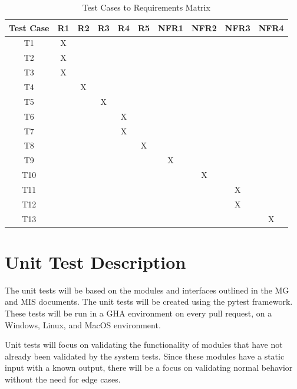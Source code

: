 \documentclass[12pt, titlepage]{article}
\begin{document}
\begin{table}[h]
\centering
\begin{tabular}{|c|c|c|c|c|c|c|c|c|c|}
\hline
\textbf{Test Case} & \textbf{R1} & \textbf{R2} & \textbf{R3} & \textbf{R4} & \textbf{R5} & \textbf{NFR1} & \textbf{NFR2} & \textbf{NFR3} & \textbf{NFR4} \\ \hline
T1 & X &   &   &   &   &   &   &   &   \\ \hline
T2 & X &   &   &   &   &   &   &   &   \\ \hline
T3 & X &   &   &   &   &   &   &   &   \\ \hline
T4 &   & X &   &   &   &   &   &   &   \\ \hline
T5 &   &   & X &   &   &   &   &   &   \\ \hline
T6 &   &   &   & X &   &   &   &   &   \\ \hline
T7 &   &   &   & X &   &   &   &   &   \\ \hline
T8 &   &   &   &   & X &   &   &   &   \\ \hline
T9 &   &   &   &   &   & X &   &   &   \\ \hline
T10 &  &   &   &   &   &   & X &   &   \\ \hline
T11 &  &   &   &   &   &   &   & X &   \\ \hline
T12 &  &   &   &   &   &   &   & X &   \\ \hline
T13 &  &   &   &   &   &   &   &   & X \\ \hline
\end{tabular}
\caption{Test Cases to Requirements Matrix}
\label{tab:test-requirements-matrix}
\end{table}

\section{Unit Test Description}

The unit tests will be based on the modules and interfaces outlined in the
MG \citep{MG} and MIS \citep{MIS} documents. The unit tests will be created using
the pytest framework. These tests will be run in a GHA environment on every pull
request, on a Windows, Linux, and MacOS environment.

Unit tests will focus on validating the functionality of modules that have
not already been validated by the system tests. Since these modules have a
static input with a known output, there will be a focus on validating
normal behavior without the need for edge cases.
\end{document}

